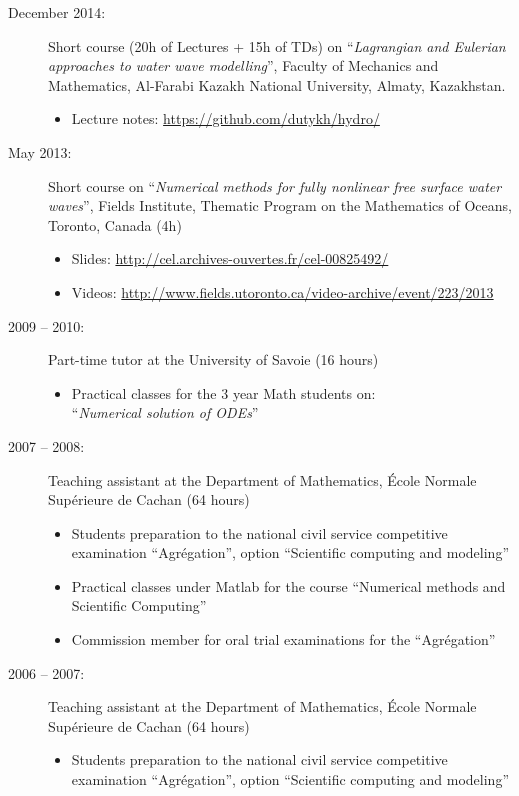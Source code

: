 \documentclass[final, a4paper, oneside, 12pt]{article}
\numberwithin{equation}{section}
\begin{document}
\begin{description}
  \item[December 2014:] Short course (20h of Lectures + 15h of TDs) on ``\textit{Lagrangian and Eulerian approaches to water wave modelling}'', Faculty of Mechanics and Mathematics, Al-Farabi Kazakh National University, Almaty, Kazakhstan.
  \begin{itemize}
    \item Lecture notes: \url{https://github.com/dutykh/hydro/}
  \end{itemize}
  
  \item[May 2013:] Short course on ``\textit{Numerical methods for fully nonlinear free surface water waves}'', Fields Institute, Thematic Program on the Mathematics of Oceans, Toronto, Canada (4h)
  \begin{itemize}
    \item Slides: \url{http://cel.archives-ouvertes.fr/cel-00825492/}
    \item Videos: \url{http://www.fields.utoronto.ca/video-archive/event/223/2013}
  \end{itemize}
  
  \item[2009 -- 2010:] Part-time tutor at the University of Savoie (16 hours)
  \begin{itemize}
    \item Practical classes for the 3 year Math students on: \\
          ``\textit{Numerical solution of ODEs}''
  \end{itemize}
  
  \item[2007 -- 2008:] Teaching assistant at the Department of Mathematics, \'Ecole Normale Sup\'erieure de Cachan (64 hours)
  \begin{itemize}
    \item Students preparation to the national civil service competitive examination ``Agr\'egation'', option ``Scientific computing and modeling''
    
    \item Practical classes under Matlab for the course ``Numerical methods and Scientific Computing''
    
    \item Commission member for oral trial examinations for the ``Agr\'egation''
  \end{itemize}
  
  \item[2006 -- 2007:] Teaching assistant at the Department of Mathematics, \'Ecole Normale Sup\'erieure de Cachan (64 hours)
  \begin{itemize}
    \item Students preparation to the national civil service competitive examination ``Agr\'egation'', option ``Scientific computing and modeling''
    

\end{itemize}
\end{description}
\end{document}
